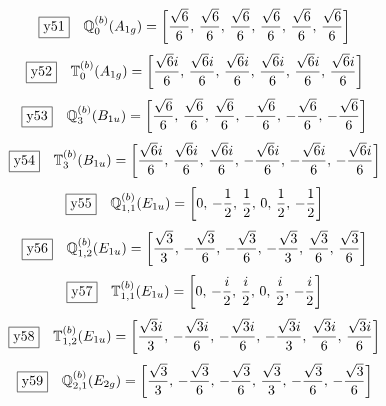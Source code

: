 \documentclass[fleqn,10pt,landscape]{jsarticle}
\begin{document}
\begin{dmath*}
\fbox{y51}\quad \mathbb{Q}_{0}^{(b)}(A_{1g})=\left[ \frac{\sqrt{6}}{6},\, \frac{\sqrt{6}}{6},\, \frac{\sqrt{6}}{6},\, \frac{\sqrt{6}}{6},\, \frac{\sqrt{6}}{6},\, \frac{\sqrt{6}}{6} \right]
\end{dmath*}
\begin{dmath*}
\fbox{y52}\quad \mathbb{T}_{0}^{(b)}(A_{1g})=\left[ \frac{\sqrt{6} i}{6},\, \frac{\sqrt{6} i}{6},\, \frac{\sqrt{6} i}{6},\, \frac{\sqrt{6} i}{6},\, \frac{\sqrt{6} i}{6},\, \frac{\sqrt{6} i}{6} \right]
\end{dmath*}
\begin{dmath*}
\fbox{y53}\quad \mathbb{Q}_{3}^{(b)}(B_{1u})=\left[ \frac{\sqrt{6}}{6},\, \frac{\sqrt{6}}{6},\, \frac{\sqrt{6}}{6},\, - \frac{\sqrt{6}}{6},\, - \frac{\sqrt{6}}{6},\, - \frac{\sqrt{6}}{6} \right]
\end{dmath*}
\begin{dmath*}
\fbox{y54}\quad \mathbb{T}_{3}^{(b)}(B_{1u})=\left[ \frac{\sqrt{6} i}{6},\, \frac{\sqrt{6} i}{6},\, \frac{\sqrt{6} i}{6},\, - \frac{\sqrt{6} i}{6},\, - \frac{\sqrt{6} i}{6},\, - \frac{\sqrt{6} i}{6} \right]
\end{dmath*}
\begin{dmath*}
\fbox{y55}\quad \mathbb{Q}_{1,1}^{(b)}(E_{1u})=\left[ 0,\, - \frac{1}{2},\, \frac{1}{2},\, 0,\, \frac{1}{2},\, - \frac{1}{2} \right]
\end{dmath*}
\begin{dmath*}
\fbox{y56}\quad \mathbb{Q}_{1,2}^{(b)}(E_{1u})=\left[ \frac{\sqrt{3}}{3},\, - \frac{\sqrt{3}}{6},\, - \frac{\sqrt{3}}{6},\, - \frac{\sqrt{3}}{3},\, \frac{\sqrt{3}}{6},\, \frac{\sqrt{3}}{6} \right]
\end{dmath*}
\begin{dmath*}
\fbox{y57}\quad \mathbb{T}_{1,1}^{(b)}(E_{1u})=\left[ 0,\, - \frac{i}{2},\, \frac{i}{2},\, 0,\, \frac{i}{2},\, - \frac{i}{2} \right]
\end{dmath*}
\begin{dmath*}
\fbox{y58}\quad \mathbb{T}_{1,2}^{(b)}(E_{1u})=\left[ \frac{\sqrt{3} i}{3},\, - \frac{\sqrt{3} i}{6},\, - \frac{\sqrt{3} i}{6},\, - \frac{\sqrt{3} i}{3},\, \frac{\sqrt{3} i}{6},\, \frac{\sqrt{3} i}{6} \right]
\end{dmath*}
\begin{dmath*}
\fbox{y59}\quad \mathbb{Q}_{2,1}^{(b)}(E_{2g})=\left[ \frac{\sqrt{3}}{3},\, - \frac{\sqrt{3}}{6},\, - \frac{\sqrt{3}}{6},\, \frac{\sqrt{3}}{3},\, - \frac{\sqrt{3}}{6},\, - \frac{\sqrt{3}}{6} \right]
\end{dmath*}
\end{document}

